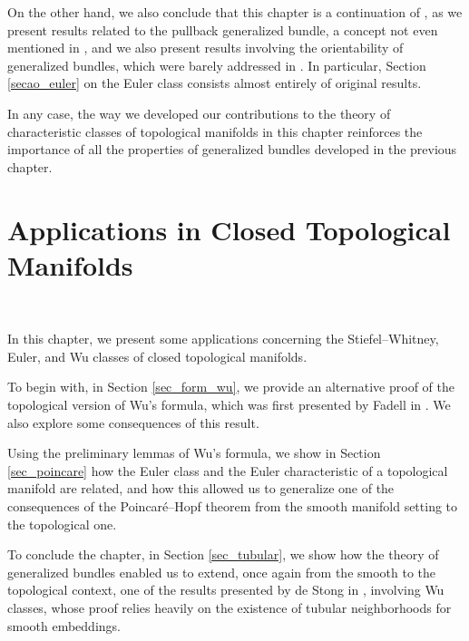 \documentclass[12pt,oneside]{book}
\begin{document}
    On the other hand, we also conclude that this chapter is a continuation of \cite{fadell_1}, as we present results related to the 
    pullback generalized bundle, a concept not even mentioned in \cite{fadell_1}, and we also present 
    results involving the orientability of generalized bundles, which were barely addressed in 
    \cite{fadell_1}. In particular, Section \ref{secao_euler} on the Euler class consists almost entirely of original results.

    In any case, the way we developed our contributions to the theory of characteristic classes of topological manifolds in this chapter 
    reinforces the importance of all the properties of generalized bundles developed in the previous chapter.





    \chapter{Applications in Closed Topological Manifolds}\label{cap_aplic}
    \thispagestyle{empty}

    \

    In this chapter, we present some applications concerning the Stiefel–Whitney, Euler, 
    and Wu classes of closed topological manifolds.

    To begin with, in Section \ref{sec_form_wu}, we provide an alternative proof of the topological version of Wu's formula, 
    which was first presented by Fadell in \cite{fadell_1}. We also explore some consequences of this result.

    Using the preliminary lemmas of Wu's formula, we show in Section \ref{sec_poincare} how the Euler class and the Euler 
    characteristic of a topological manifold are related, and how this allowed us to generalize one of the 
    consequences of the Poincaré–Hopf theorem from the smooth manifold setting to the 
    topological one.

    To conclude the chapter, in Section \ref{sec_tubular}, we show how the theory of generalized bundles enabled us 
    to extend, once again from the smooth to the topological context, one of the results presented by de Stong in \cite{stong}, involving Wu 
    classes, whose proof relies heavily on the existence of tubular neighborhoods for smooth 
    embeddings.
\end{document}
